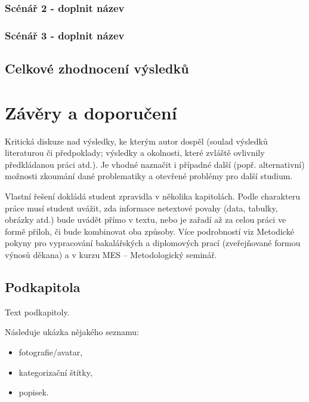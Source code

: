 \subsubsection{Scénář 2 - doplnit název}

\subsubsection{Scénář 3 - doplnit název}

\subsection{Celkové zhodnocení výsledků}

\section{Závěry a doporučení}


Kritická diskuze nad výsledky, ke kterým autor dospěl (soulad výsledků  literaturou či předpoklady;
výsledky a okolnosti, které zvláště ovlivnily předkládanou práci atd.).
Je vhodné naznačit i případné další
(popř. alternativní) možnosti zkoumání dané problematiky a otevřené problémy pro další studium.


Vlastní řešení dokládá student zpravidla v několika kapitolách.
Podle charakteru práce musí student uvážit, zda informace
netextové povahy (data, tabulky, obrázky atd.) bude uvádět přímo v textu, nebo je zařadí až za celou práci ve formě příloh, či bude kombinovat oba způsoby.
Více podrobností viz Metodické pokyny pro vypracování bakalářských a diplomových prací (zveřejňované formou výnosů děkana)
a v kurzu MES – Metodologický seminář.

	\subsection{Podkapitola}

	Text podkapitoly.

	Následuje ukázka nějakého seznamu:
	\begin{itemize}
		\item fotografie/avatar,
		\item kategorizační štítky,
		\item popisek.
	\end{itemize}

